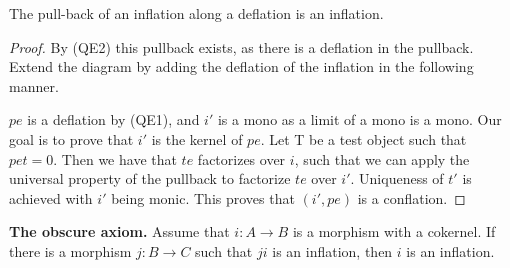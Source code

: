     \begin{corollary}
        The pull-back of an inflation along a deflation is an inflation.
        \begin{center}
        \end{center}
    \end{corollary}

    \begin{proof}
        By (QE2) this pullback exists, as there is a deflation in the pullback. Extend the diagram by adding the deflation of the inflation in the following manner.
        \begin{center}
        \end{center}
        $pe$ is a deflation by (QE1), and $i'$ is a mono as a limit of a mono is a mono. Our goal is to prove that $i'$ is the kernel of $pe$. Let T be a test object such that $pet=0$. Then we have that $te$ factorizes over $i$, such that we can apply the universal property of the pullback to factorize $te$ over $i'$. Uniqueness of $t'$ is achieved with $i'$ being monic. This proves that $(i',pe)$ is a conflation.
    \end{proof}

    \begin{theorem}
        \textbf{The obscure axiom.} Assume that $i:A\rightarrow B$ is a morphism with a cokernel. If there is a morphism $j:B\rightarrow C$ such that $ji$ is an inflation, then $i$ is an inflation.
    \end{theorem}

